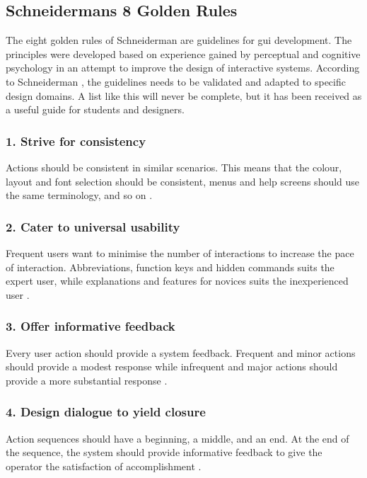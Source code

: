 \subsection{Schneidermans 8 Golden Rules}
\label{sec:schneiderman}
The eight golden rules of Schneiderman are guidelines for \acrshort{gui} development. The principles were developed based on experience gained by perceptual and cognitive psychology in an attempt to improve the design of interactive systems. According to Schneiderman \cite{schneiderman}, the guidelines needs to be validated and adapted to specific design domains. A list like this will never be complete, but it has been received as a useful guide for students and designers.

\subsubsection{1. Strive for consistency}
Actions should be consistent in similar scenarios. This means that the colour, layout and font selection should be consistent, menus and help screens should use the same terminology, and so on \cite{schneiderman}.

\subsubsection{2. Cater to universal usability}
Frequent users want to minimise the number of interactions to increase the pace of interaction. Abbreviations, function keys and hidden commands suits the expert user, while explanations and features for novices suits the inexperienced user \cite{schneiderman}.

\subsubsection{3. Offer informative feedback}
Every user action should provide a system feedback. Frequent and minor actions should provide a modest response while infrequent and major actions should provide a more substantial response \cite{schneiderman}.

\subsubsection{4. Design dialogue to yield closure}
Action sequences should have a beginning, a middle, and an end. At the end of the sequence, the system should provide informative feedback to give the operator the satisfaction of accomplishment \cite{schneiderman}.

